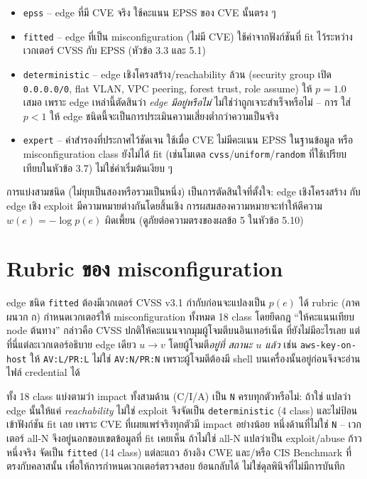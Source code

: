 \begin{itemize}[leftmargin=1.6em]
\item \texttt{epss} -- edge ที่มี CVE จริง ใช้คะแนน EPSS ของ CVE นั้นตรง ๆ
\item \texttt{fitted} -- edge ที่เป็น misconfiguration (ไม่มี CVE) ใช้ค่าจากฟังก์ชันที่ fit
ไว้ระหว่างเวกเตอร์ CVSS กับ EPSS (หัวข้อ 3.3 และ 5.1)
\item \texttt{deterministic} -- edge เชิงโครงสร้าง/reachability ล้วน (security group
เปิด \texttt{0.0.0.0/0}, flat VLAN, VPC peering, forest trust, role assume) ให้ $p=1.0$
เสมอ เพราะ edge เหล่านี้ตัดสินว่า \emph{edge มีอยู่หรือไม่} ไม่ใช่ว่าถูกเจาะสำเร็จหรือไม่ -- การ
ใส่ $p<1$ ให้ edge ชนิดนี้จะเป็นการประเมินความเสี่ยงต่ำกว่าความเป็นจริง
\item \texttt{expert} -- ค่าสำรองที่ประกาศไว้ชัดเจน ใช้เมื่อ CVE ไม่มีคะแนน EPSS ในฐานข้อมูล
หรือ misconfiguration class ยังไม่ได้ fit (เช่นโมเดล \texttt{cvss}/\texttt{uniform}/\texttt{random}
ที่ใช้เปรียบเทียบในหัวข้อ 3.7) ไม่ใช่ค่าเริ่มต้นเงียบ ๆ
\end{itemize}

การแบ่งสามชนิด (ไม่ยุบเป็นสองหรือรวมเป็นหนึ่ง) เป็นการตัดสินใจที่ตั้งใจ: edge เชิงโครงสร้าง
กับ edge เชิง exploit มีความหมายต่างกันโดยสิ้นเชิง การผสมสองความหมายจะทำให้ตีความ
$w(e)=-\log p(e)$ ผิดเพี้ยน (ดูภัยต่อความตรงของผลข้อ 5 ในหัวข้อ 5.10)

\section{Rubric ของ misconfiguration}

edge ชนิด \texttt{fitted} ต้องมีเวกเตอร์ CVSS v3.1 กำกับก่อนจะแปลงเป็น $p(e)$ ได้
rubric (ภาคผนวก ก) กำหนดเวกเตอร์ให้ misconfiguration ทั้งหมด 18 class โดยยึดกฎ
``ให้คะแนนเทียบ node ต้นทาง'' กล่าวคือ CVSS ปกติให้คะแนนจากมุมผู้โจมตีบนอินเทอร์เน็ต
ที่ยังไม่มีอะไรเลย แต่ที่นี่แต่ละเวกเตอร์อธิบาย edge เดียว $u \to v$ โดยผู้โจมตี\emph{อยู่ที่
สถานะ $u$ แล้ว} เช่น \texttt{aws-key-on-host} ให้ \texttt{AV:L/PR:L} ไม่ใช่ \texttt{AV:N/PR:N}
เพราะผู้โจมตีต้องมี shell บนเครื่องนั้นอยู่ก่อนจึงจะอ่านไฟล์ credential ได้

ทั้ง 18 class แบ่งตามว่า impact ทั้งสามด้าน (C/I/A) เป็น \texttt{N} ครบทุกตัวหรือไม่: ถ้าใช่
แปลว่า edge นั้นให้แค่ \emph{reachability} ไม่ใช่ exploit จึงจัดเป็น \texttt{deterministic}
(4 class) และไม่ป้อนเข้าฟังก์ชัน fit เลย เพราะ CVE ที่เผยแพร่จริงทุกตัวมี impact อย่างน้อย
หนึ่งด้านที่ไม่ใช่ \texttt{N} -- เวกเตอร์ all-N จึงอยู่นอกขอบเขตข้อมูลที่ fit เคยเห็น ถ้าไม่ใช่
all-N แปลว่าเป็น exploit/abuse ก้าวหนึ่งจริง จัดเป็น \texttt{fitted} (14 class) แต่ละแถว
อ้างอิง CWE และ/หรือ CIS Benchmark ที่ตรงกับคลาสนั้น เพื่อให้การกำหนดเวกเตอร์ตรวจสอบ
ย้อนกลับได้ ไม่ใช่ดุลพินิจที่ไม่มีการบันทึก

